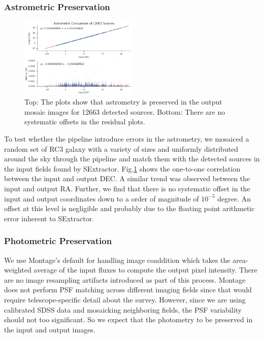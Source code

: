 \documentclass[authoryear, 12pt, 5p, times]{elsarticle}
\begin{document}
\subsubsection{Astrometric Preservation\label{astrometry}}

\begin{figure}[h]
\includegraphics[width=0.5\textwidth]{figures/astrometry.png}
\caption{Top: The plots show that astrometry is preserved in the output mosaic images for 12663 detected sources. Bottom: There are no systematic offsets in the residual plots.}
\label{ra}
\end{figure}
To test whether the pipeline introduce errors in the astrometry, we mosaiced a random set of RC3 galaxy with a variety of sizes and uniformly distributed around the sky %
through the pipeline and match them with the detected sources in the input fields found by SExtractor.  Fig.\ref{ra} shows the one-to-one correlation between the input and output DEC. A similar trend was observed between the input and output RA. Further, we find that there is no systematic offset in the input and output coordinates down to a order of magnitude of $10^{-5}$ degree. An offset at this level is negligible and probably due to the floating point arithmetic error inherent to SExtractor.
\subsubsection{Photometric Preservation\label{photo}}

We use Montage's default for handling image coaddition which takes the area-weighted average of the input fluxes to compute the output pixel intensity. There are no image resampling artifacts introduced as part of this process. Montage does not perform PSF matching across different imaging fields since that would require telescope-specific detail about the survey. However, since we are using calibrated SDSS data and mosaicking neighboring fields, the PSF variability should not too significant. So we expect that the photometry to be preserved in the input and output images.
\end{document}
